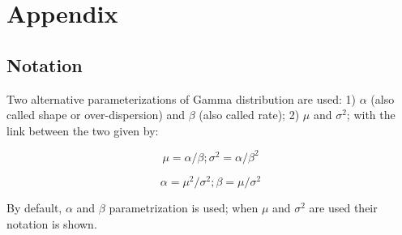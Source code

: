 \documentclass[11pt,a4paper]{article}
\begin{document}
\section{Appendix} \label{Appendix}

\subsection{Notation} \label{Notation}

Two alternative parameterizations of Gamma distribution are used: 1) $\alpha$ (also called shape or over-dispersion) and $\beta$ (also called rate); 2) $\mu$ and $\sigma^2$; with the link between the two given by:
\begin{linenomath*} \begin{equation} \label{eq:gamma_to_mu}
    \mu = \alpha / \beta; \sigma^2 = \alpha / \beta^2
\end{equation} \end{linenomath*}
\begin{linenomath*} \begin{equation} \label{eq:gamma_to_alpha}
    \alpha = \mu^2 / \sigma^2; \beta = \mu / \sigma^2
\end{equation} \end{linenomath*}
By default, $\alpha$ and $\beta$ parametrization is used; when $\mu$ and $\sigma^2$ are used their notation is shown.

\printbibliography
\end{document}
